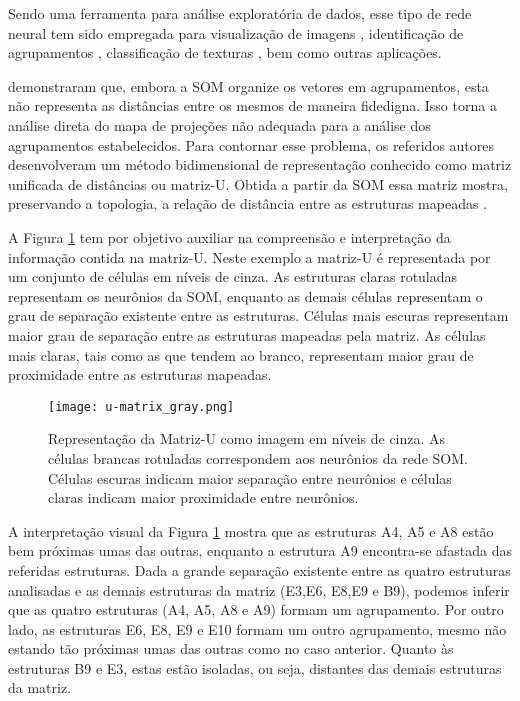 Sendo uma ferramenta para análise exploratória de dados, esse tipo de rede neural tem sido empregada para visualização de imagens \cite{Strong2011774}, identificação de agrupamentos \cite{Kuroiwa200031}, classificação de texturas \cite{595364}, bem como outras aplicações.

 demonstraram que, embora a \ac{SOM} organize os vetores em agrupamentos, esta não representa as distâncias entre os mesmos de maneira fidedigna. Isso torna a análise direta do mapa de projeções não adequada para a análise dos agrupamentos estabelecidos. Para contornar esse problema, os referidos autores desenvolveram um método bidimensional de representação conhecido como matriz unificada de distâncias ou matriz-U. Obtida a partir da \ac{SOM} essa matriz mostra, preservando a topologia, a relação de distância entre as estruturas mapeadas \cite{Ultsch:1990}. 

A Figura \ref{fig:u-matrix} tem por objetivo auxiliar na compreensão e interpretação da informação contida na matriz-U. Neste exemplo a matriz-U é representada por um conjunto de células em níveis de cinza. As estruturas claras rotuladas representam os neurônios da \ac{SOM}, enquanto as demais células representam o grau de separação existente entre as estruturas. Células mais escuras representam maior grau de separação entre as estruturas mapeadas pela matriz. As células mais claras, tais como as que tendem ao branco, representam maior grau de proximidade entre as estruturas mapeadas. 

\begin{figure}[]
  \caption{\label{fig:u-matrix} Representação da Matriz-U como imagem em níveis de cinza. As células brancas rotuladas correspondem aos neurônios da rede \ac{SOM}. Células escuras indicam maior separação entre neurônios e células claras indicam maior proximidade entre neurônios.}
  \centering
  \texttt{[image: u-matrix\_gray.png]}
\end{figure}

A interpretação visual da  Figura \ref{fig:u-matrix} mostra que as estruturas A4, A5 e A8 estão bem próximas umas das outras, enquanto a estrutura A9 encontra-se afastada das referidas estruturas. Dada a grande separação existente entre as quatro estruturas analisadas e as demais estruturas da matriz (E3,E6, E8,E9 e B9), podemos inferir que as quatro estruturas (A4, A5, A8 e A9) formam um agrupamento. Por outro lado, as estruturas E6, E8, E9 e E10 formam um outro agrupamento, mesmo não estando tão próximas umas das outras como no caso anterior. Quanto às estruturas B9 e E3, estas estão isoladas, ou seja, distantes das demais estruturas da matriz.

